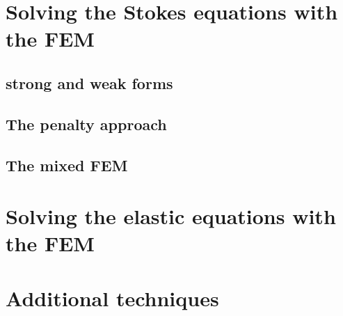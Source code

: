 \documentclass[a4paper]{article}
\begin{document}
\section{Solving the Stokes equations with the FEM} %

\subsection{strong and weak forms}  %

\subsection{The penalty approach}  %

\subsection{The mixed FEM}  %



\newpage
\section{Solving the elastic equations with the FEM}









\newpage
\section{Additional techniques} %
\end{document}
